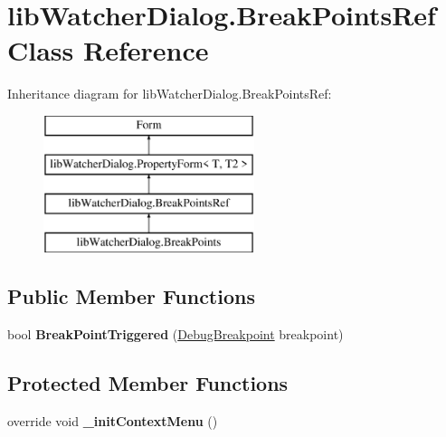 \hypertarget{classlib_watcher_dialog_1_1_break_points_ref}{\section{lib\+Watcher\+Dialog.\+Break\+Points\+Ref Class Reference}
\label{classlib_watcher_dialog_1_1_break_points_ref}
}
Inheritance diagram for lib\+Watcher\+Dialog.\+Break\+Points\+Ref\+:\begin{figure}[H]
\begin{center}
\leavevmode
\includegraphics[height=4.000000cm]{classlib_watcher_dialog_1_1_break_points_ref}
\end{center}
\end{figure}
\subsection*{Public Member Functions}
\begin{DoxyCompactItemize}
\item 
\hypertarget{classlib_watcher_dialog_1_1_break_points_ref_a78ef6c1dbe2cdc5093184c0181cdf3fa}{bool {\bfseries Break\+Point\+Triggered} (\hyperlink{classlib_wather_debugger_1_1_breakpoint_1_1_debug_breakpoint}{Debug\+Breakpoint} breakpoint)}\label{classlib_watcher_dialog_1_1_break_points_ref_a78ef6c1dbe2cdc5093184c0181cdf3fa}

\end{DoxyCompactItemize}
\subsection*{Protected Member Functions}
\begin{DoxyCompactItemize}
\item 
\hypertarget{classlib_watcher_dialog_1_1_break_points_ref_a5dc1217d6b7de6cad00aabfac6c3bbb4}{override void {\bfseries \+\_\+init\+Context\+Menu} ()}\label{classlib_watcher_dialog_1_1_break_points_ref_a5dc1217d6b7de6cad00aabfac6c3bbb4}

\end{DoxyCompactItemize}
